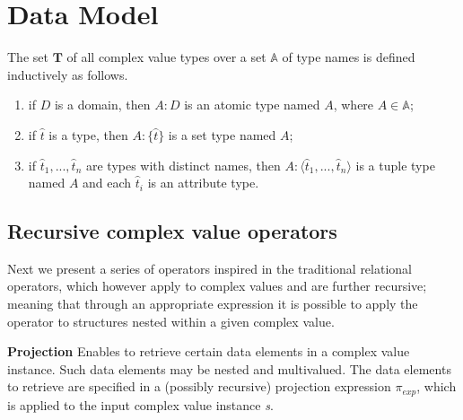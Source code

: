 
\section{Data Model}\label{sec:dataModel}

\noindent The set $\mathbf{T}$ of all complex value types over a set $\mathbb{A}$ of type names is defined inductively as follows.

\begin{enumerate}
	\item if $D$ is a domain, then $A:D$ is an atomic type named $A$, where $A \in \mathbb{A}$;
	\item if $\hat{t}$ is a type, then $A:\{\hat{t}\}$ is a set type named $A$;
	\item if $\hat{t}_1, ..., \hat{t}_n$ are types with distinct names, then $A:\langle \hat{t}_1, ..., \hat{t}_n \rangle$ is a tuple type named $A$ and each $\hat{t}_i$ is an attribute type.
\end{enumerate}

\subsection{Recursive complex value operators}

Next we present a series of operators inspired in the traditional relational operators, which however apply to complex values and are further recursive; meaning that through an appropriate expression it is possible to apply the operator to structures nested within a given complex value.

\vspace*{0.25cm}
\textbf{Projection} Enables to retrieve certain data elements in a complex value instance. Such data elements may be nested and multivalued. The data elements to retrieve are specified in a (possibly recursive) projection expression $\pi_{exp}$, which is applied to the input complex value instance \textit{s}.

